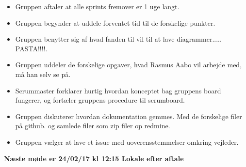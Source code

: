 \documentclass[12pt]{article}
\begin{document}
\begin{itemize}
\item Gruppen aftaler at alle sprints fremover er 1 uge langt.
\item Gruppen begynder at uddele forventet tid til de forskelige punkter.  
\item Gruppen benytter sig af hvad fanden til vil til at lave diagrammer..... PASTA!!!!. 
\item Gruppen uddeler de forskelige opgaver, hvad Rasmus Aabo vil arbejde med, må han selv se på.
\item Scrummaster forklarer hurtig hvordan konceptet bag gruppens board fungerer, og fortæler gruppens procedure til scrumboard. 
\item Gruppen diskuterer hvordan dokumentation gemmes. Med de forskelige filer på github. og samlede filer som zip filer op redmine.  
\item Gruppen vælger at lave et issue med uoverensstemmelser omkring vejleder. 
\end{itemize}

\large{\textbf{Næste møde er 24/02/17 kl 12:15 Lokale efter aftale }}
\end{document}
